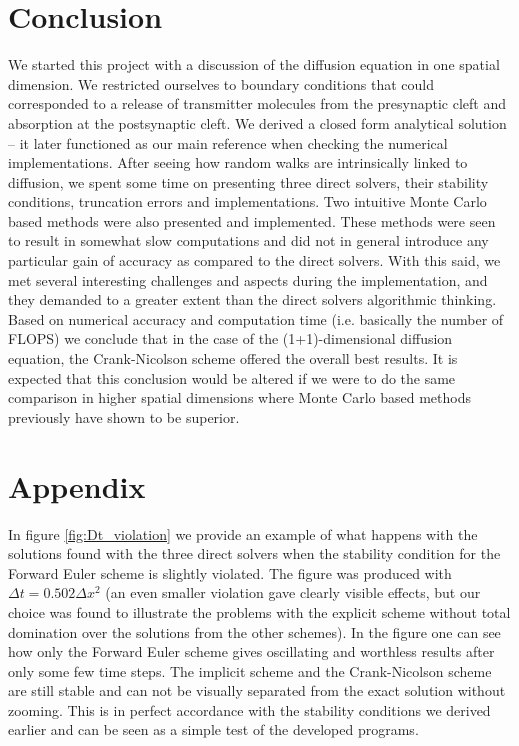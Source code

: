 \documentclass[a4paper, 11pt, notitlepage,english]{article}
\begin{document}
\section{Conclusion}
We started this project with a discussion of the diffusion equation in one spatial dimension. We restricted ourselves to boundary conditions that could corresponded to a release of transmitter molecules from the presynaptic cleft and absorption at the postsynaptic cleft. We derived a closed form analytical solution – it later functioned as our main reference when checking the numerical implementations. After seeing how random walks are intrinsically linked to diffusion, we spent some time on presenting three direct solvers, their stability conditions, truncation errors and implementations. Two intuitive Monte Carlo based methods were also presented and implemented. These methods were seen to result in somewhat slow computations and did not in general introduce any particular gain of accuracy as compared to the direct solvers. With this said, we met several interesting challenges and aspects during the implementation, and they demanded to a greater extent than the direct solvers algorithmic thinking. \\

Based on numerical accuracy and computation time (i.e. basically the number of FLOPS) we conclude that in the case of the (1+1)-dimensional diffusion equation, the Crank-Nicolson scheme offered the overall best results. It is expected that this conclusion would be altered if we were to do the same comparison in higher spatial dimensions where Monte Carlo based methods previously have shown to be superior.

\section{Appendix}
In figure \ref{fig:Dt_violation} we provide an example of what happens with the solutions found with the three direct solvers when the stability condition for the Forward Euler scheme is slightly violated. The figure was produced with $\Delta t = 0.502 \Delta x^2$ (an even smaller violation gave clearly visible effects, but our choice was found to illustrate the problems with the explicit scheme without total domination over the solutions from the other schemes). In the figure one can see how only the Forward Euler scheme gives oscillating and worthless results after only some few time steps. The implicit scheme and the Crank-Nicolson scheme are still stable and can not be visually separated from the exact solution without zooming. This is in perfect accordance with the stability conditions we derived earlier and can be seen as a simple test of the developed programs.
\end{document}
